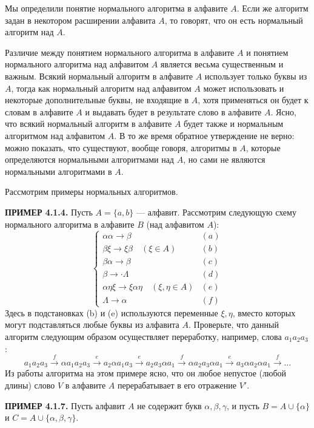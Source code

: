 \documentclass[a4paper,12pt]{article}
\begin{document}
Мы определили понятие нормального алгоритма в алфавите \(A\). Если же алгоритм задан в некотором расширении алфавита \(A\), то говорят, что он есть нормальный алгоритм над \(A\).

Различие между понятием нормального алгоритма в алфавите \(A\) и понятием нормального алгоритма над алфавитом \(A\) является весьма существенным и важным. Всякий нормальный алгоритм в алфавите \(A\) использует только буквы из \(A\), тогда как нормальный алгоритм над алфавитом \(A\) может использовать и некоторые дополнительные буквы, не входящие в \(A\), хотя применяться он будет к словам в алфавите \(A\) и выдавать будет в результате слово в алфавите \(A\). Ясно, что всякий нормальный алгоритм в алфавите \(A\) будет также и нормальным алгоритмом над алфавитом \(A\). В то же время обратное утверждение не верно: можно показать, что существуют, вообще говоря, алгоритмы в \(A\), которые определяются нормальными алгоритмами над \(A\), но сами не являются нормальными алгоритмами в \(A\).

Рассмотрим примеры нормальных алгоритмов.

\textbf{ПРИМЕР 4.1.4.} Пусть \(A = \{a, b\}\) --- алфавит. Рассмотрим следующую схему нормального алгоритма в алфавите \(B\) (над алфавитом \(A\)):
\[
\begin{cases}
\alpha\alpha \to \beta & (a) \\
\beta\xi \to \xi\beta \quad (\xi \in A) & (b) \\
\beta\alpha \to \beta & (c) \\
\beta \to \cdot \Lambda & (d) \\
\alpha\eta\xi \to \xi\alpha\eta \quad (\xi, \eta \in A) & (e) \\
\Lambda \to \alpha & (f)
\end{cases}
\]
Здесь в подстановках (b) и (e) используются переменные \(\xi, \eta\), вместо которых могут подставляться любые буквы из алфавита \(A\). Проверьте, что данный алгоритм следующим образом осуществляет переработку, например, слова \(a_1 a_2 a_3\):
\[
a_1 a_2 a_3 \xrightarrow{f} \alpha a_1 a_2 a_3 \xrightarrow{e} a_2 \alpha a_1 a_3 \xrightarrow{e} a_2 a_3 \alpha a_1 \xrightarrow{f} \alpha a_2 a_3 \alpha a_1 \xrightarrow{e} a_3 \alpha a_2 \alpha a_1 \xrightarrow{f} \dots
\]
Из работы алгоритма на этом примере ясно, что он любое непустое (любой длины) слово \(V\) в алфавите \(A\) перерабатывает в его отражение \(V'\).

\textbf{ПРИМЕР 4.1.7.} Пусть алфавит \(A\) не содержит букв \(\alpha, \beta, \gamma\), и пусть \(B = A \cup \{\alpha\}\) и \(C = A \cup \{\alpha, \beta, \gamma\}\).
\end{document}
